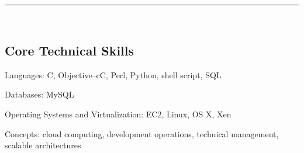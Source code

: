 \documentclass[10pt,letterpaper]{article}
\newenvironment{indentsection}[1]%
{\begin{list}{}%
	{\setlength{\leftmargin}{#1}}%
	\item[]%
}
{\end{list}}
\begin{document}
\hrule\
\vspace{-0.4em}
\subsection*{Core Technical Skills}

\begin{indentsection}{\parindent}
	\begin{description*}
		\item[Languages:]
		C, Objective--cC, Perl, Python, shell script, SQL
		\item[Databases:]
		MySQL
		\item[Operating Systems and Virtualization:]
		EC2, Linux, OS X, Xen
		\item[Concepts:]
		cloud computing, development operations, technical management, scalable architectures	
	\end{description*}
\end{indentsection}
\end{document}
